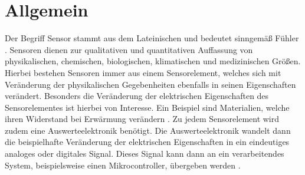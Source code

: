 \section{Allgemein}

Der Begriff Sensor stammt aus dem Lateinischen und bedeutet sinngemäß \glqq Fühler \grqq. 
Sensoren dienen zur qualitativen und quantitativen Auffassung von physikalischen, chemischen, biologischen, klimatischen und medizinischen Größen. \cite{Hering:2023a}
Hierbei bestehen Sensoren immer aus einem Sensorelement, welches sich mit Veränderung der physikalischen Gegebenheiten ebenfalls in seinen Eigenschaften verändert. 
Besonders die Veränderung der elektrischen Eigenschaften des Sensorelementes ist hierbei von Interesse. Ein Beispiel sind Materialien, welche ihren Widerstand bei Erwärmung verändern \cite{Roddeck:2023}. 
Zu jedem Sensorelement wird zudem eine Auswerteelektronik benötigt. Die Auswerteelektronik wandelt dann die beispielhafte Veränderung der elektrischen Eigenschaften in ein eindeutiges analoges oder digitales Signal. Dieses Signal kann dann an ein verarbeitendes System, beispielsweise einen Mikrocontroller, übergeben werden \cite{Hering:2023a}. 


